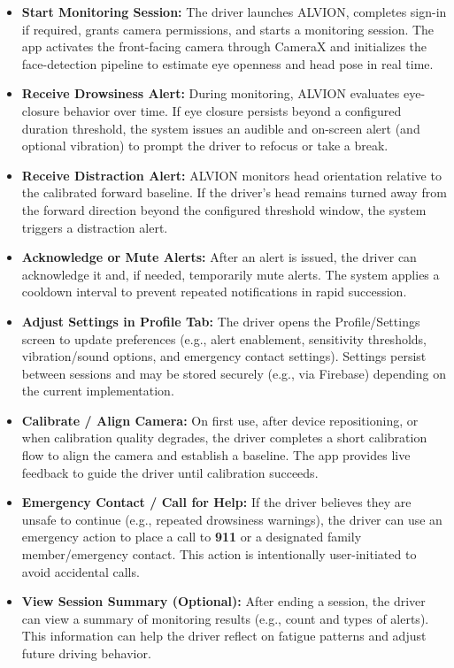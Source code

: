 \documentclass[11pt]{report}
\begin{document}
\begin{itemize}

    \item \textbf{Start Monitoring Session:}
    The driver launches ALVION, completes sign-in if required, grants camera permissions, and starts a monitoring session. The app activates the front-facing camera through CameraX and initializes the face-detection pipeline to estimate eye openness and head pose in real time.

    \item \textbf{Receive Drowsiness Alert:}
    During monitoring, ALVION evaluates eye-closure behavior over time. If eye closure persists beyond a configured duration threshold, the system issues an audible and on-screen alert (and optional vibration) to prompt the driver to refocus or take a break.

    \item \textbf{Receive Distraction Alert:}
    ALVION monitors head orientation relative to the calibrated forward baseline. If the driver’s head remains turned away from the forward direction beyond the configured threshold window, the system triggers a distraction alert.

    \item \textbf{Acknowledge or Mute Alerts:}
    After an alert is issued, the driver can acknowledge it and, if needed, temporarily mute alerts. The system applies a cooldown interval to prevent repeated notifications in rapid succession.

    \item \textbf{Adjust Settings in Profile Tab:}
    The driver opens the Profile/Settings screen to update preferences (e.g., alert enablement, sensitivity thresholds, vibration/sound options, and emergency contact settings). Settings persist between sessions and may be stored securely (e.g., via Firebase) depending on the current implementation.

    \item \textbf{Calibrate / Align Camera:}
    On first use, after device repositioning, or when calibration quality degrades, the driver completes a short calibration flow to align the camera and establish a baseline. The app provides live feedback to guide the driver until calibration succeeds.

    \item \textbf{Emergency Contact / Call for Help:}
    If the driver believes they are unsafe to continue (e.g., repeated drowsiness warnings), the driver can use an emergency action to place a call to \textbf{911} or a designated family member/emergency contact. This action is intentionally user-initiated to avoid accidental calls.

    \item \textbf{View Session Summary (Optional):}
    After ending a session, the driver can view a summary of monitoring results (e.g., count and types of alerts). This information can help the driver reflect on fatigue patterns and adjust future driving behavior.

\end{itemize}
\end{document}
